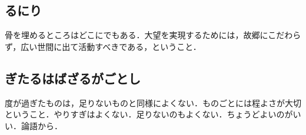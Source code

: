             \subsection{るにり}
            骨を埋めるところはどこにでもある．大望を実現するためには，故郷にこだわらず，広い世間に出て活動すべきである，ということ．

            \subsection{ぎたるはばざるがごとし}
            度が過ぎたものは，足りないものと同様によくない．ものごとには程よさが大切ということ．やりすぎはよくない．足りないのもよくない．ちょうどよいのがいい．論語から．